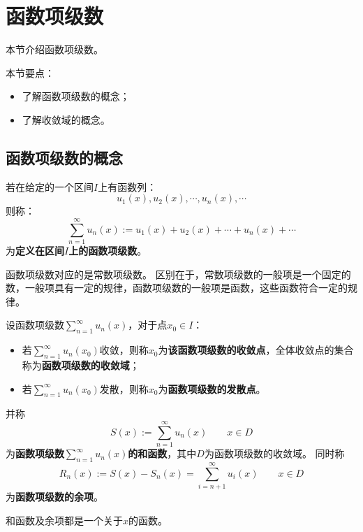 \section{函数项级数}

本节介绍函数项级数。

本节要点：
\begin{itemize}
    \item 了解函数项级数的概念；
    \item 了解收敛域的概念。
\end{itemize}

\subsection{函数项级数的概念}

\begin{definition}[函数项级数]
若在给定的一个区间$I$上有函数列：
\[
u_1\left( x \right) ,u_2\left( x \right) ,\cdots ,u_n\left( x \right) ,\cdots
\]
则称：
\[
\sum_{n=1}^{\infty}{u_n\left( x \right)}:=u_1\left( x \right) +u_2\left( x \right) +\cdots +u_n\left( x \right) +\cdots
\]
为{\bf 定义在区间$I$上的函数项级数}。
\end{definition}

函数项级数对应的是常数项级数。
区别在于，常数项级数的一般项是一个固定的数，一般项具有一定的规律，函数项级数的一般项是函数，这些函数符合一定的规律。

\begin{definition}
设函数项级数$\sum_{n=1}^{\infty}{u_n\left( x \right)}$，对于点$x_0\in I$：
\begin{itemize}
    \item 若$\sum_{n=1}^{\infty}{u_n\left( x_0 \right)}$收敛，则称$x_0$为{\bf 该函数项级数的收敛点}，全体收敛点的集合称为{\bf 函数项级数的收敛域}；
    \item 若$\sum_{n=1}^{\infty}{u_n\left( x_0 \right)}$发散，则称$x_0$为{\bf 函数项级数的发散点}。
\end{itemize}
并称
\[
S\left( x \right) :=\sum_{n=1}^{\infty}{u_n\left( x \right)} \qquad x\in D
\]
为{\bf 函数项级数$\sum_{n=1}^{\infty}{u_n\left( x \right)}$的和函数}，其中$D$为函数项级数的收敛域。
同时称
\[
R_n\left( x \right) :=S\left( x \right) -S_n\left( x \right) =\sum_{i=n+1}^{\infty}{u_i\left( x \right)} \qquad x\in D
\]
为{\bf 函数项级数的余项}。
\end{definition}

和函数及余项都是一个关于$x$的函数。

